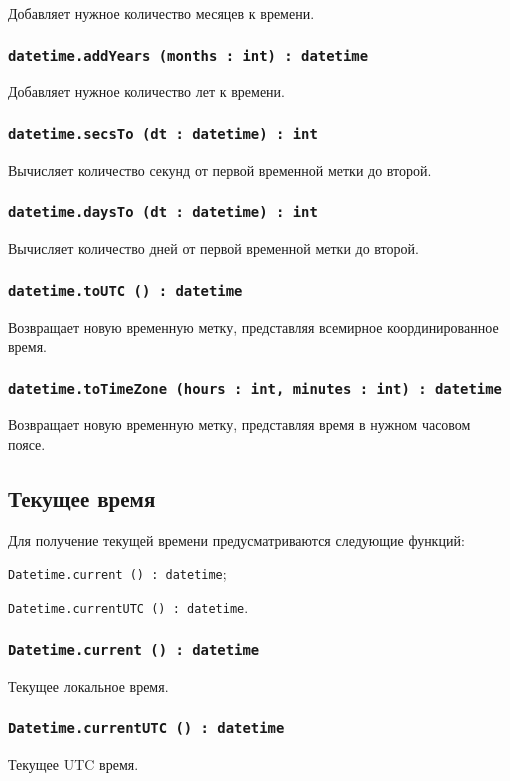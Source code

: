 Добавляет нужное количество месяцев к времени.

\subsubsection{\lstinline|datetime.addYears (months : int) : datetime|}

Добавляет нужное количество лет к времени.

\subsubsection{\lstinline|datetime.secsTo (dt : datetime) : int|}

Вычисляет количество секунд от первой временной метки до второй.

\subsubsection{\lstinline|datetime.daysTo (dt : datetime) : int|}

Вычисляет количество дней от первой временной метки до второй.

\subsubsection{\lstinline|datetime.toUTC () : datetime|}

Возвращает новую временную метку, представляя всемирное координированное время.

\subsubsection{\lstinline|datetime.toTimeZone (hours : int, minutes : int) : datetime|}

Возвращает новую временную метку, представляя время в нужном часовом поясе.

\subsection{Текущее время}

Для получение текущей времени предусматриваются следующие функций:
\begin{icItems}
	\item \lstinline|Datetime.current () : datetime|;
	\item \lstinline|Datetime.currentUTC () : datetime|.
\end{icItems}

\subsubsection{\lstinline|Datetime.current () : datetime|}

Текущее локальное время.

\subsubsection{\lstinline|Datetime.currentUTC () : datetime|}

Текущее UTC время.
